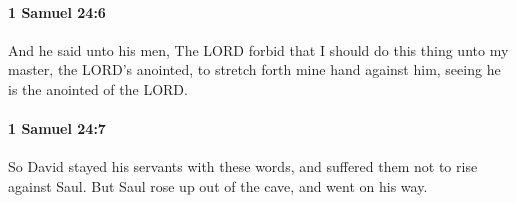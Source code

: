 		\paragraph{1 Samuel 24:6} %
			\label{1SAMUEL-24-6}

			And he said unto his men, The LORD forbid that I should do this thing unto my master, the LORD’s anointed, to stretch forth mine hand against him, seeing he is the anointed of the LORD.


		\paragraph{1 Samuel 24:7} %
			\label{1SAMUEL-24-7}

			So David stayed his servants with these words, and suffered them not to rise against Saul. But Saul rose up out of the cave, and went on his way.


